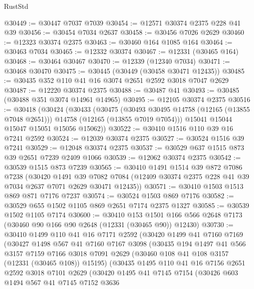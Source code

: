 \begin{lexlean}{RustStd}
\begin{coremodule}
@30449 := @30447 @7037 @7039
@30454 := @12571 @30374 @2375 @228 @41 @39
@30456 := @30454 @7034 @2637
@30458 := @30456 @7026 @2629
@30460 := @12323 @30374 @2375
@30463 := @30460 @164 @1085 @164
@30464 := @30463 @7034
@30465 := @12332 @30374
@30467 := @12331 (@30465 @164)
@30468 := @30464 @30467
@30470 := @12339 (@12340 @7034)
@30471 := @30468 @30470
@30475 := @30445 (@30449 (@30458 @30471 @12435))
@30485 := @30435 @352 @110 @41 @16 @3074 @2651 @2592 @3018 @7047 @2629
@30487 := @12220 @30374 @2375
@30488 := @30487 @41
@30493 := @30485 (@30488 @351 @3074 @14961 @14965)
@30495 := @12105 @30374 @2375
@30516 := @30418
    (@30424
      (@30433
        (@30475
          (@30493 @30495 @14758 (@12165 (@13855 @7048 @2651)))
          @14758
          (@12165 (@13855 @7019 @7054)))
        @15041
        @15044
        @15047
        @15051
        @15056
        @15062))
@30522 := @30410 @1516 @110 @39 @16 @7241 @2592
@30524 := @12039 @30374 @2375
@30527 := @30524 @1516 @39 @7241
@30529 := @12048 @30374 @2375
@30537 := @30529 @637 @1515 @873 @39 @2651 @7239 @2409 @1066
@30539 := @12062 @30374 @2375
@30542 := @30539 @1515 @873 @7239
@30565 := @30410
    @1491
    @1514
    @39
    @872
    @7086
    @7238
    (@30420
      @1491
      @39
      @7082
      @7084
      (@12409 @30374 @2375 @228 @41 @39 @7034 @2637 @7071 @2629 @30471 @12435))
@30571 := @30410 @1503 @1513 @869 @871 @7176 @7237
@30574 := @30524 @1503 @869 @7176
@30582 := @30529 @655 @1502 @1105 @869 @2651 @7174 @2375 @1327
@30585 := @30539 @1502 @1105 @7174
@30600 := @30410
    @153
    @1501
    @166
    @566
    @2648
    @7173
    (@30460 @90 @166 @90 @2648 (@12331 (@30465 @90)) @12430)
@30730 := @30410
    @1499
    @110
    @41
    @16
    @7171
    @2592
    (@30420
      @1499
      @41
      @7160
      @7169
      (@30427
        @1498
        @567
        @41
        @7160
        @7167
        @3098
        (@30435
          @194
          @1497
          @41
          @566
          @3157
          @7159
          @7166
          @3018
          @7091
          @2629
          (@30460 @108 @41 @108 @3157 (@12331 (@30465 @108)) @15195)
          (@30435
            @1495
            @110
            @41
            @16
            @7156
            @2651
            @2592
            @3018
            @7101
            @2629
            (@30420
              @1495
              @41
              @7145
              @7154
              (@30426
                @603
                @1494
                @567
                @41
                @7145
                @7152
                @3636

\end{coremodule}
\end{lexlean}
